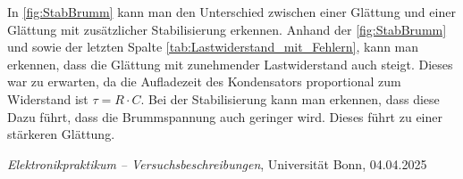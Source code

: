 \documentclass{article}
\begin{document}
In \autoref{fig:StabBrumm} kann man den Unterschied zwischen einer Glättung und einer Glättung mit zusätzlicher Stabilisierung erkennen. Anhand der \autoref{fig:StabBrumm} und sowie der letzten Spalte \autoref{tab:Lastwiderstand_mit_Fehlern}, kann man erkennen, dass die Glättung mit zunehmender Lastwiderstand auch steigt. Dieses war zu erwarten, da die Aufladezeit des Kondensators proportional zum Widerstand ist $\tau = R \cdot C$. Bei der Stabilisierung kann man erkennen, dass diese Dazu führt, dass die Brummspannung auch geringer wird. Dieses führt zu einer stärkeren Glättung.



        \begin{thebibliography}{9}
        
        \textit{Elektronikpraktikum -- Versuchsbeschreibungen}, Universität Bonn, 04.04.2025
        
        
        \end{thebibliography}
\end{document}
